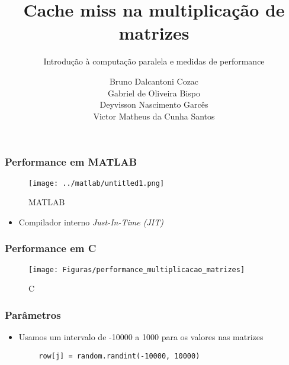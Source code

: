 \documentclass[utf8]{beamer}
\theoremstyle{definition}
\begin{document}
	\author{ Bruno Dalcantoni Cozac \\
		  	 Gabriel de Oliveira Bispo\\
			 Deyvisson Nascimento Garcês \\
			 Victor Matheus da Cunha Santos \\ }
	\title{Cache miss na multiplicação de matrizes}
	\subtitle{Introdução à computação paralela e medidas de performance}
	\subject{}

	\begin{frame}[plain]
		\maketitle
	\end{frame}




\begin{frame}
		\frametitle{Performance em MATLAB}
	\begin{figure}[H]
		\centering
		\texttt{[image: ../matlab/untitled1.png]}
		\caption{MATLAB}
		\label{fig:matmultr2022}
	\end{figure}
	
\end{frame}
\begin{frame}
	\begin{itemize}
		\item Compilador interno \textit{Just-In-Time (JIT)}
	\end{itemize}
\end{frame}


\begin{frame}
	\frametitle{Performance em C}
	\begin{figure}[H]
		\centering
		\texttt{[image: Figuras/performance\_multiplicacao\_matrizes]}
		\caption{C}
		\label{fig:performace_c}
	\end{figure}
	
\end{frame}

\begin{frame}[fragile]
	\frametitle{Parâmetros}
	\begin{itemize}
		\item Usamos um intervalo de -10000 a 1000 para os valores nas matrizes
	\end{itemize}
	\begin{lstlisting}
		row[j] = random.randint(-10000, 10000)
	\end{lstlisting}

\end{frame}
\end{document}
